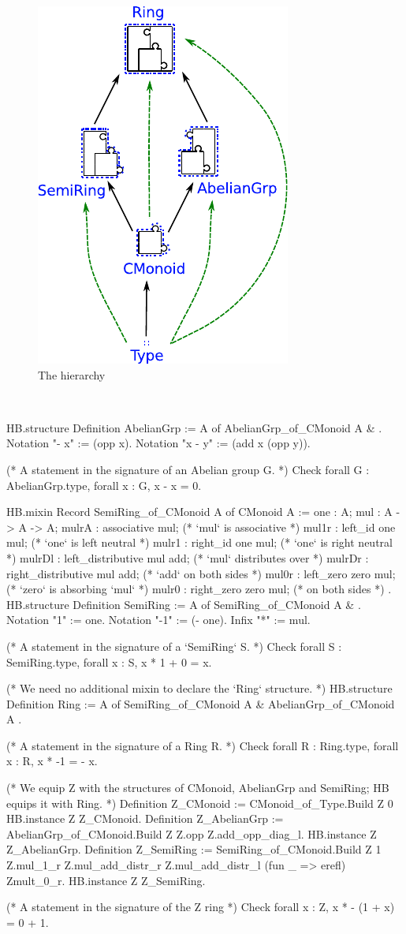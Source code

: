 \documentclass{easychair}
\begin{document}
\begin{figure}
  \vspace{1em}
  \includegraphics[width=.35\textwidth]{diagram.pdf}
  \vspace{-1.5em}
  \caption{The hierarchy}
  \label{fig:hierarchy}
\end{figure}
\
\begin{coqcode}
HB.structure Definition AbelianGrp := { A of AbelianGrp_of_CMonoid A & }.
Notation "- x"   := (opp x).
Notation "x - y" := (add x (opp y)).

(* A statement in the signature of an Abelian group G. *)
Check forall G : AbelianGrp.type, forall x : G, x - x = 0.

HB.mixin Record SemiRing_of_CMonoid A of CMonoid A := {
  one    : A;
  mul    : A -> A -> A;
  mulrA  : associative mul;  (* `mul` is associative   *)
  mul1r  : left_id one mul;  (* `one` is left neutral  *)
  mulr1  : right_id one mul; (* `one` is right neutral *)
  mulrDl : left_distributive mul add;  (* `mul` distributes over *)
  mulrDr : right_distributive mul add; (*   `add` on both sides  *)
  mul0r  : left_zero zero mul;  (* `zero` is absorbing `mul`     *)
  mulr0  : right_zero zero mul; (*   on both sides               *)
}.
HB.structure Definition SemiRing := { A of SemiRing_of_CMonoid A & }.
Notation "1"  := one.
Notation "-1" := (- one).
Infix    "*"  := mul.

(* A statement in the signature of a `SemiRing` S.  *)
Check forall S : SemiRing.type, forall x : S, x * 1 + 0 = x.

(* We need no additional mixin to declare the `Ring` structure. *)
HB.structure Definition Ring := { A of SemiRing_of_CMonoid A & AbelianGrp_of_CMonoid A }.

(* A statement in the signature of a Ring R.  *)
Check forall R : Ring.type, forall x : R, x * -1 = - x.

(* We equip Z with the structures of CMonoid, AbelianGrp and SemiRing; HB equips it with Ring. *)
Definition Z_CMonoid    := CMonoid_of_Type.Build Z 0%
HB.instance Z Z_CMonoid.
Definition Z_AbelianGrp := AbelianGrp_of_CMonoid.Build Z Z.opp Z.add_opp_diag_l.
HB.instance Z Z_AbelianGrp.
Definition Z_SemiRing   := SemiRing_of_CMonoid.Build Z 1%
  Z.mul_1_r Z.mul_add_distr_r Z.mul_add_distr_l (fun _ => erefl) Zmult_0_r.
HB.instance Z Z_SemiRing.

(* A statement in the signature of the Z ring *)
Check forall x : Z, x * - (1 + x) = 0 + 1.
\end{coqcode}
\end{document}
